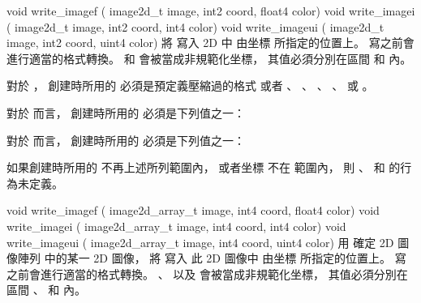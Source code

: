 void write_imagef (
	image2d_t image,
	int2 coord,
	float4 color)
void write_imagei (
	image2d_t image,
	int2 coord,
	int4 color)
void write_imageui (
	image2d_t image,
	int2 coord,
	uint4 color)
\stopbuffer
{}
將  寫入 2D   中
由坐標  所指定的位置上。
寫之前會進行適當的格式轉換。
 和  會被當成非規範化坐標，
其值必須分別在區間 
和  內。

對於 ，
創建時所用的  必須是預定義壓縮過的格式
或者 、 、 、
 、  或 。

對於  而言，
創建時所用的  必須是下列值之一：
\startigBase
\item {}
\item {}
\item {}
\stopigBase

對於  而言，
創建時所用的  必須是下列值之一：
\startigBase
\item {}
\item {}
\item {}
\stopigBase

如果創建時所用的  不再上述所列範圍內，
或者坐標  不在 
範圍內，
則 、  和  的行為未定義。
\stopbuffer

void write_imagef (
	image2d_array_t image,
	int4 coord,
	float4 color)
void write_imagei (
	image2d_array_t image,
	int4 coord,
	int4 color)
void write_imageui (
	image2d_array_t image,
	int4 coord,
	uint4 color)
\stopbuffer
{}
用  確定 2D 圖像陣列  中的某一 2D 圖像，
將  寫入 此 2D 圖像中
由坐標  所指定的位置上。
寫之前會進行適當的格式轉換。
、  以及  會被當成非規範化坐標，
其值必須分別在區間 、
 和  內。

